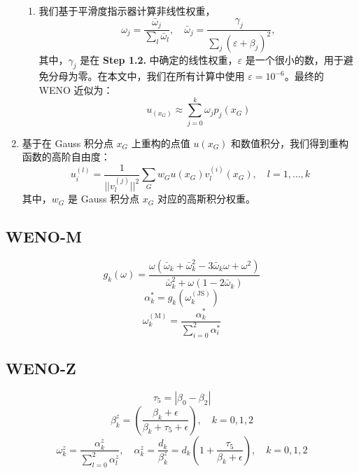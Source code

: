 \documentclass{article}
\numberwithin{equation}{subsection}    %
\begin{document}
\begin{enumerate}[label={{\bf Step \arabic*}:}]
\begin{enumerate}[label={\bf Step 1.\arabic*.}]
              \item 我们基于平滑度指示器计算非线性权重，
                    \begin{equation}
                        \omega_{j}=\frac{\bar{\omega}_{j}}{\sum_{l} \bar{\omega}_{l}}, \quad \bar{\omega}_{j}=\frac{\gamma_{j}}{\sum_{j}\left(\varepsilon+\beta_{j}\right)^{2}},
                    \end{equation}
                    其中，$\gamma_j$ 是在 {\bf Step 1.2.} 中确定的线性权重，$\varepsilon$ 是一个很小的数，用于避免分母为零。在本文中，我们在所有计算中使用 $\varepsilon=10^{-6}$。最终的 WENO 近似为：
                    \begin{equation}
                        u_{(x_G)} \approx \sum_{j=0}^{k} \omega_{j} p_{j}\left(x_{G}\right)
                    \end{equation}
          \end{enumerate}
    \item 基于在 Gauss 积分点 $x_G$ 上重构的点值 $u(x_G)$ 和数值积分，我们得到重构函数的高阶自由度：
          \begin{equation}
              u_{i}^{(l)}=\frac{1}{||v_{l}^{(j)}||^2} \sum_{G} w_{G} u\left(x_{G}\right) v_{l}^{(i)}\left(x_{G}\right), \quad l=1, \ldots, k
          \end{equation}
          其中，$w_{G}$ 是 Gauss 积分点 $x_{G}$ 对应的高斯积分权重。
\end{enumerate}
\subsection{WENO-M}
\begin{equation}
    g_{k}(\omega)=\frac{\omega\left(\bar{\omega}_{k}+\bar{\omega}_{k}^{2}-3 \bar{\omega}_{k} \omega+\omega^{2}\right)}{\bar{\omega}_{k}^{2}+\omega\left(1-2 \bar{\omega}_{k}\right)}
\end{equation}
\begin{equation}
    \alpha_{k}^{*}=g_{k}\left(\omega_{k}^{(\mathrm{JS})}\right)
\end{equation}
\begin{equation}
    \omega_{k}^{(\mathrm{M})}=\frac{\alpha_{k}^{*}}{\sum_{i=0}^{2} \alpha_{i}^{*}}
\end{equation}

\subsection{WENO-Z}
\begin{equation}
    \tau_{5}=\left|\beta_{0}-\beta_{2}\right|
\end{equation}
\begin{equation}
    \beta_{k}^{z}=\left(\frac{\beta_{k}+\epsilon}{\beta_{k}+\tau_{5}+\epsilon}\right), \quad k=0,1,2
\end{equation}
\begin{equation}
    \omega_{k}^{z}=\frac{\alpha_{k}^{z}}{\sum_{l=0}^{2} \alpha_{l}^{z}}, \quad \alpha_{k}^{z}=\frac{d_{k}}{\beta_{k}^{z}}=d_{k}\left(1+\frac{\tau_{5}}{\beta_{k}+\epsilon}\right), \quad k=0,1,2
\end{equation}
\end{document}
